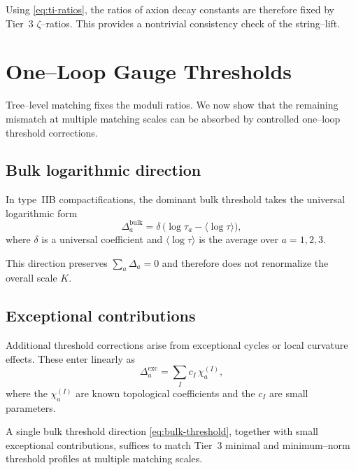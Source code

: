 \documentclass[11pt]{article}
\begin{document}
\begin{remark}
Using \eqref{eq:ti-ratios}, the ratios of axion decay constants are
therefore fixed by Tier~3 $\zeta$--ratios.
This provides a nontrivial consistency check of the string--lift.
\end{remark}

\section{One--Loop Gauge Thresholds}

Tree--level matching fixes the moduli ratios.
We now show that the remaining mismatch at multiple matching scales
can be absorbed by controlled one--loop threshold corrections.

\subsection{Bulk logarithmic direction}

In type~IIB compactifications, the dominant bulk threshold takes the
universal logarithmic form
\begin{equation}
\Delta_a^{\mathrm{bulk}}
=
\delta\,
\bigl(\log \tau_a - \langle \log \tau \rangle\bigr),
\label{eq:bulk-threshold}
\end{equation}
where $\delta$ is a universal coefficient and
$\langle \log \tau \rangle$ is the average over $a=1,2,3$.

\begin{remark}
This direction preserves $\sum_a \Delta_a = 0$ and therefore does not
renormalize the overall scale $K$.
\end{remark}

\subsection{Exceptional contributions}

Additional threshold corrections arise from exceptional cycles or local
curvature effects.
These enter linearly as
\begin{equation}
\Delta_a^{\mathrm{exc}} = \sum_I c_I\,\chi_a^{(I)},
\end{equation}
where the $\chi_a^{(I)}$ are known topological coefficients and the $c_I$
are small parameters.

\begin{proposition}
\label{prop:threshold-sufficiency}
A single bulk threshold direction \eqref{eq:bulk-threshold}, together
with small exceptional contributions, suffices to match Tier~3 minimal
and minimum--norm threshold profiles at multiple matching scales.
\end{proposition}
\end{document}
